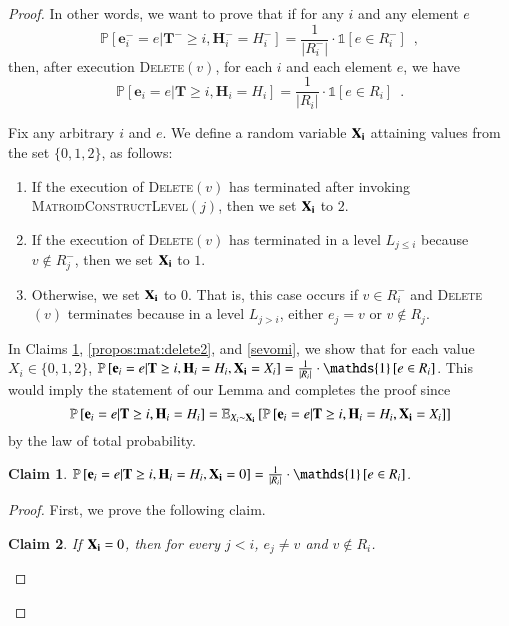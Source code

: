 \documentclass[11pt]{article}
\newtheorem{claim}{Claim}[section]
\renewcommand{\Pr}[1]{\ensuremath{\mathbb{P}\left[#1\right]}}
\newcommand{\Exu}[2]{\ensuremath{\mathbb{E}_{#1}\left[#2\right]}}
\newcommand{\ind}[1]{\ensuremath{\mathds{1}\left[#1\right]}}
\newcommand{\MatroidConstLevel}{\textsc{MatroidConstructLevel}}
\newcommand{\deletev}{{\textsc{Delete}}}
\newcommand{\bE}{\ensuremath{\mathbf{e}}}
\newcommand{\bT}{\ensuremath{\mathbf{T}}}
\newcommand{\bH}{\ensuremath{\mathbf{H}}}
\begin{document}
\begin{proof}
In other words, we want to prove that if for any $i$ and any element $e$ 
\[
    \Pr{\bE_i^- = e | \bT^- \geq i, \bH_i^- = H_i^-} = 
    \frac{1}{|R_i^{-}|} \cdot \ind{e \in R_i^{-}} \enspace ,
\]
then, after execution \deletev$(v)$, for each $i$ and each element $e$, we have 
\[
    \Pr{\bE_i = e | \bT \geq i, \bH_i = H_i} = 
    \frac{1}{|R_i|} \cdot \ind{e \in R_i} \enspace .
\]



Fix any arbitrary $i$ and $e$. 
We define a random variable $\bold{X_i}$ attaining values from the set $ \{0, 1, 2\}$, as follows:
    \begin{enumerate}
    \item If the execution of \deletev$(v)$ has terminated after invoking \MatroidConstLevel$(j)$, then we set $\bold{X_i}$ to $2$.
    \item If the execution of \deletev$(v)$ has terminated in a level $L_{j \leq i}$ because $v \notin R^-_j$, then we set $\bold{X_i}$ to $1$.
    \item Otherwise, we set $\bold{X_i}$ to $0$. 
    That is, this case occurs if $v \in R_i^-$ and \deletev$(v)$ terminates because in a level $L_{j > i}$, 
    either $e_j=v$ or $v \notin R_j$.
\end{enumerate}


In Claims \ref{propos:mat:delete1}, \ref{propos:mat:delete2}, and \ref{sevomi},
we show that for each value $X_i \in \{0, 1, 2\}$, 
$\Pr{\bE_i = e | \bT \geq i, \bH_i = H_i, \bold{X_i} = X_i} = \frac{1}{|R_i|} \cdot \ind{e \in R_i}$. 
This would imply the statement of our Lemma and completes the proof since 
\begin{equation*}
    \Pr{\bE_i = e | \bT \geq i, \bH_i = H_i}=
\Exu{X_i\sim \bold{X_i} }{\Pr{\bE_i = e | \bT \geq i, \bH_i = H_i, \bold{X_i}=X_i}}
\end{equation*}
by the law of total probability.


\begin{claim}
\label{propos:mat:delete1}
$\Pr{\bE_i = e | \bT \geq i, \bH_i = H_i, \bold{X_i} = 0} = \frac{1}{|R_i|} \cdot \ind{e \in R_i}$.    
\end{claim}




\begin{proof}
First, we prove the following claim. 

\begin{claim}
\label{prop:not:in:x0}
If $\bold{X_i} = 0$,  then for every $j < i$, $e_j \ne v$ and $v \notin R_i$. 
\end{claim}



\end{proof}
\end{proof}
\end{document}
